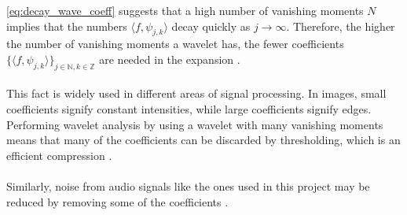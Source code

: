 
\eqref{eq:decay_wave_coeff} suggests that a high number of vanishing moments $N$ implies that the numbers $\langle f, \psi_{j,k} \rangle$ decay quickly as $j \to \infty$. Therefore, the higher the number of vanishing moments a wavelet has, the fewer coefficients $\{ \langle f, \psi_{j,k} \rangle \}_{j\in\mathbb{N},k\in\mathbb{Z}}$ are needed in the expansion \cite{page 170, FSE2010}.
\\ \\
This fact is widely used in different areas of signal processing. In images, small coefficients signify constant intensities, while large coefficients signify edges. Performing wavelet analysis by using a wavelet with many vanishing moments means that many of the coefficients can be discarded by thresholding, which is an efficient compression \cite{page 174, FSE2010}.
\\ \\
Similarly, noise from audio signals like the ones used in this project may be reduced by removing some of the coefficients \cite{page 175, FSE2010}.